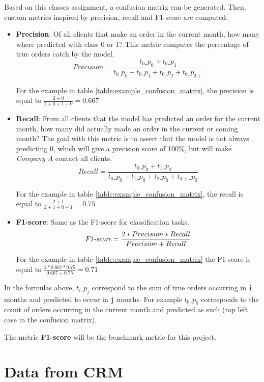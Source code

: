 Based on this classes assignment, a confusion matrix can be generated. Then, custom metrics inspired by precision, recall and F1-score are computed:
\begin{itemize}
    \item \textbf{Precision}: Of all clients that make an order in the current month, how many where predicted with class 0 or 1? This metric computes the percentage of true orders catch by the model. 
    $$ Precision = \frac{t_0\_p_0 + t_0\_p_1}{t_0\_p_0 + t_0\_p_1 + t_0\_p_2 + t_0\_p_{3+}} $$
    
    For the example in table \ref{table:example_confusion_matrix}, the precision is equal to $\frac{2+0}{2+0+1+0} = 0.667$
    
    \item \textbf{Recall}: From all clients that the model has predicted an order for the current month, how many did actually made an order in the current or coming month? The goal with this metric is to assert that the model is not always predicting 0, which will give a precision score of 100\%, but will make \textit{Company A} contact all clients. 
    $$ Recall = \frac{t_0\_p_0 + t_1\_p_0}{t_0\_p_0 + t_1\_p_0 + t_2\_p_0 + t_{3+}\_p_0} $$
    
    For the example in table \ref{table:example_confusion_matrix}, the recall is equal to $\frac{2+1}{2+1+0+1} = 0.75$
    
    \item \textbf{F1-score}: Same as the F1-score for classification tasks. 
    $$ \operatorname{\textit{F1-score}} = \frac{2*Precision*Recall}{Precision+Recall} $$

    For the example in table \ref{table:example_confusion_matrix} the F1-score is equal to $\frac{2*0.667*0.75}{0.667+0.75} = 0.71$
\end{itemize}

In the formulas above, $t_i\_p_j$ correspond to the sum of true orders occurring in \texttt{i} months and predicted to occur in \texttt{j} months. For example $t_0\_p_0$ corresponds to the count of orders occurring in the current month and predicted as such (top left case in the confusion matrix).

The metric \textbf{F1-score} will be the benchmark metric for this project.

\section{Data from CRM} \label{sec:crm-data}

